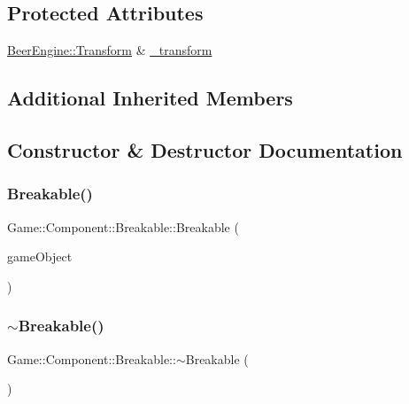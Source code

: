 \subsection*{Protected Attributes}
\begin{DoxyCompactItemize}
\item 
\mbox{\hyperlink{class_beer_engine_1_1_transform}{Beer\+Engine\+::\+Transform}} \& \mbox{\hyperlink{class_game_1_1_component_1_1_breakable_a97c7499afa143aa9493c206adcb5eee0}{\+\_\+transform}}
\end{DoxyCompactItemize}
\subsection*{Additional Inherited Members}


\subsection{Constructor \& Destructor Documentation}
\mbox{\label{class_game_1_1_component_1_1_breakable_ad739d120313be059576347fd7c691173}} 
\subsubsection{\texorpdfstring{Breakable()}{Breakable()}}
{\footnotesize\ttfamily Game\+::\+Component\+::\+Breakable\+::\+Breakable (\begin{DoxyParamCaption}\item[{\mbox{\hyperlink{class_beer_engine_1_1_game_object}{Beer\+Engine\+::\+Game\+Object}} $\ast$}]{game\+Object }\end{DoxyParamCaption})}

\mbox{\label{class_game_1_1_component_1_1_breakable_a865e322dd9c71227b699f85bd492b481}} 
\subsubsection{\texorpdfstring{$\sim$\+Breakable()}{~Breakable()}}
{\footnotesize\ttfamily Game\+::\+Component\+::\+Breakable\+::$\sim$\+Breakable (\begin{DoxyParamCaption}\item[{void}]{ }\end{DoxyParamCaption})}



